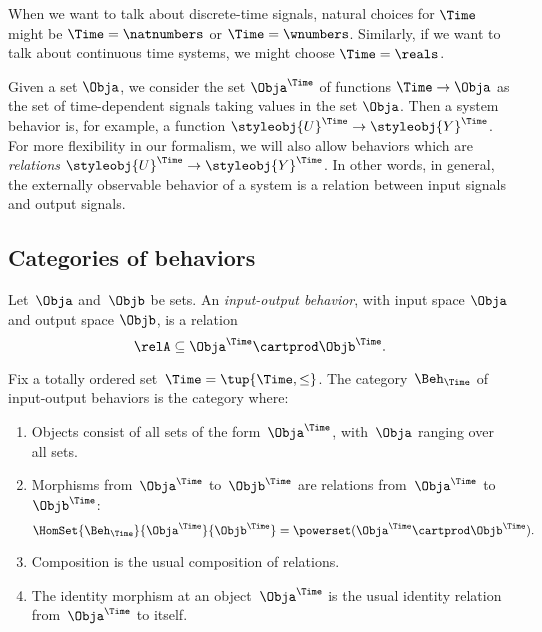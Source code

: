When we want to talk about discrete-time signals, natural choices for $\Time$ might be $\Time = \natnumbers$ or $\Time = \wnumbers$.
Similarly, if we want to talk about continuous time systems, we might choose $\Time = \reals$.

Given a set $\Obja$, we consider the set $\Obja^\Time$ of functions $\Time \to \Obja$ as the set of time-dependent signals taking values in the set $\Obja$.
Then a system behavior is, for example, a function $\styleobj{U}^\Time \to \styleobj{Y}^\Time$.
For more flexibility in our formalism, we will also allow behaviors which are \emph{relations} $\styleobj{U}^\Time \to \styleobj{Y}^\Time$.
In other words, in general, the externally observable behavior of a system is a relation between input signals and output signals.

\subsection{Categories of behaviors}

\begin{definition}
    Let~$\Obja$ and~$\Objb$ be sets.
    An \emph{input-output behavior}, with input space $\Obja$ and output space $\Objb$, is a relation
    \begin{equation*}
        \relA \subseteq \Obja^\Time \cartprod \Objb^\Time.
    \end{equation*}
\end{definition}

\begin{definition}
    Fix a totally ordered set~$\Time = \tup{\Time, \leq}$.
    The category~$\Beh_\Time$ of input-output behaviors is the category where:
    \begin{enumerate}
        \item Objects consist of all sets of the form~$\Obja^\Time$, with~$\Obja$ ranging over all sets.
        \item Morphisms from~$\Obja^\Time$ to~$\Objb^\Time$ are relations from~$\Obja^\Time$ to~$\Objb^\Time$:
              \begin{equation}
                  \HomSet{\Beh_\Time}{\Obja^\Time}{\Objb^\Time} = \powerset (\Obja^\Time \cartprod \Objb^\Time).
              \end{equation}
        \item Composition is the usual composition of relations.
        \item The identity morphism at an object~$\Obja^\Time$ is the usual identity relation from~$\Obja^\Time$ to itself.
    \end{enumerate}
\end{definition}

